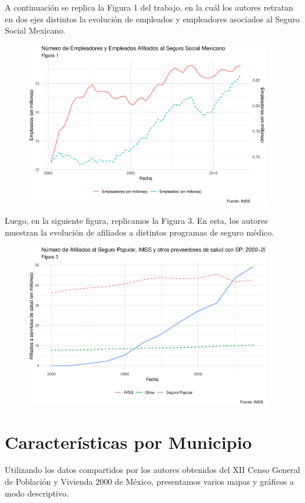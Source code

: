 \documentclass[9pt]{article}
\begin{document}
 A continuaci\'on se replica la Figura 1 del trabajo, en la cu\'al los autores retratan en dos ejes distintos la evoluci\'on de empleados y empleadores asociados al Seguro Social Mexicano.
 \begin{figure}[H]
     \centering
     \includegraphics[width=0.95\textwidth]{figs/employement.eps}
     \label{fig1}
 \end{figure}
 Luego, en la siguiente figura, replicamos la Figura 3. En esta, los autores muestran la evoluci\'on de afiliados a distintos programas de seguro m\'edico.
  \begin{figure}[H]
     \centering
     \includegraphics[width=0.95\textwidth]{figs/figura3.eps}
     \label{fig3}
 \end{figure}
 \section*{Caracter\'isticas por Municipio}
 Utilizando los datos compartidos por los autores obtenidos del XII Censo General de Población y Vivienda 2000 de M\'exico, presentamos varios mapas y gr\'aficos a modo descriptivo.
 
\end{document}
